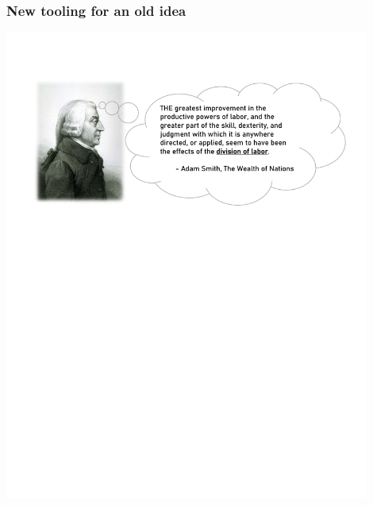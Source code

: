\begin{frame}\frametitle{New tooling for an old idea}

\vspace{0.3cm}
\centering
\includegraphics[width=0.90\textwidth]{material/crop-adam-smith.pdf}\\

\end{frame}

